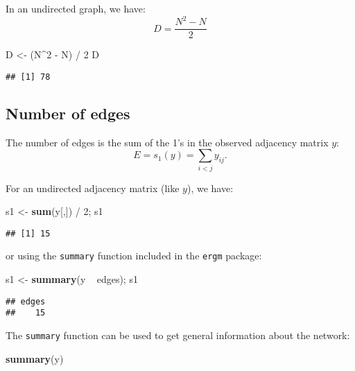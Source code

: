 \documentclass[]{book}
\newenvironment{Shaded}{\begin{snugshade}}{\end{snugshade}}
\newcommand{\KeywordTok}[1]{\textcolor[rgb]{0.13,0.29,0.53}{\textbf{{#1}}}}
\newcommand{\DecValTok}[1]{\textcolor[rgb]{0.00,0.00,0.81}{{#1}}}
\newcommand{\StringTok}[1]{\textcolor[rgb]{0.31,0.60,0.02}{{#1}}}
\newcommand{\NormalTok}[1]{{#1}}
\begin{document}
In an undirected graph, we have: \[
D = \frac{N^2 - N}{2}
\]

\begin{Shaded}
\begin{Highlighting}[]
\NormalTok{D <-}\StringTok{ }\NormalTok{(N^}\DecValTok{2} \NormalTok{-}\StringTok{ }\NormalTok{N) /}\StringTok{ }\DecValTok{2}
\NormalTok{D}
\end{Highlighting}
\end{Shaded}

\begin{verbatim}
## [1] 78
\end{verbatim}

\subsection{Number of edges}\label{number-of-edges}

The number of edges is the sum of the 1's in the observed adjacency
matrix \(y\): \[
E = s_1(y) = \sum_{i < j} y_{ij}.
\]

For an undirected adjacency matrix (like \(y\)), we have:

\begin{Shaded}
\begin{Highlighting}[]
\NormalTok{s1 <-}\StringTok{ }\KeywordTok{sum}\NormalTok{(y[,]) /}\StringTok{ }\DecValTok{2}\NormalTok{; s1}
\end{Highlighting}
\end{Shaded}

\begin{verbatim}
## [1] 15
\end{verbatim}

or using the \texttt{summary} function included in the \texttt{ergm}
package:

\begin{Shaded}
\begin{Highlighting}[]
\NormalTok{s1 <-}\StringTok{ }\KeywordTok{summary}\NormalTok{(y ~}\StringTok{ }\NormalTok{edges); s1}
\end{Highlighting}
\end{Shaded}

\begin{verbatim}
## edges 
##    15
\end{verbatim}

The \texttt{summary} function can be used to get general information
about the network:

\begin{Shaded}
\begin{Highlighting}[]
\KeywordTok{summary}\NormalTok{(y)}
\end{Highlighting}
\end{Shaded}
\end{document}
